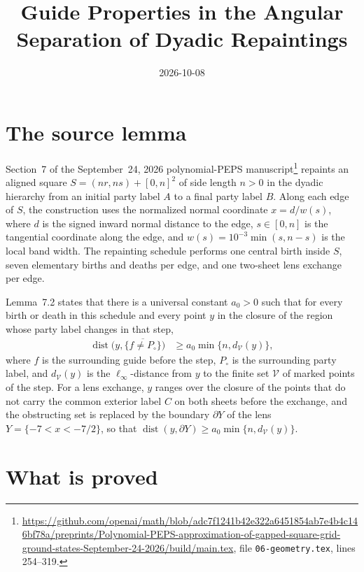 \documentclass{article}
\title{Guide Properties in the Angular Separation of Dyadic Repaintings}
\author{}
\date{2026-10-08}
\begin{document}
\maketitle
{}

\section{The source lemma}

Section~7 of the September~24, 2026 polynomial-PEPS manuscript\footnote{%
\url{https://github.com/openai/math/blob/adc7f1241b42e322a6451854ab7e4b4c146bf78a/preprints/Polynomial-PEPS-approximation-of-gapped-square-grid-ground-states-September-24-2026/build/main.tex},
file \texttt{06-geometry.tex}, lines 254--319.}
repaints an aligned square $S=(nr,ns)+[0,n]^2$ of side length $n>0$ in the
dyadic hierarchy from an initial party label $A$ to a final party label $B$.
Along each edge of $S$, the construction uses the normalized normal coordinate
$x=d/w(s)$, where $d$ is the signed inward normal distance to the edge, $s\in[0,n]$
is the tangential coordinate along the edge, and $w(s)=10^{-3}\min(s,n-s)$ is
the local band width. The repainting schedule performs one central birth inside
$S$, seven elementary births and deaths per edge, and one two-sheet lens
exchange per edge.

Lemma~7.2 states that there is a universal constant $a_0>0$ such that for every
birth or death in this schedule and every point $y$ in the closure of the region
whose party label changes in that step,
\begin{align}
    \operatorname{dist}\bigl(y,\overline{\{f\ne P_\circ\}}\bigr)
        &\ge a_0\min\{n,d_{\mathcal V}(y)\},
    \label{eq:openai26_dyadic_geometry_guide_properties_clearance}
\end{align}
where $f$ is the surrounding guide before the step, $P_\circ$ is the surrounding
party label, and $d_{\mathcal V}(y)$ is the $\ell_\infty$-distance from $y$ to
the finite set $\mathcal V$ of marked points of the step. For a lens exchange,
$y$ ranges over the closure of the points that do not carry the common exterior
label $C$ on both sheets before the exchange, and the obstructing set is
replaced by the boundary $\partial Y$ of the lens $Y=\{-7<x<-7/2\}$, so that
$\operatorname{dist}(y,\partial Y)\ge a_0\min\{n,d_{\mathcal V}(y)\}$.

\section{What is proved}
\end{document}

